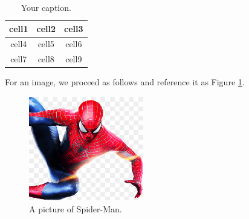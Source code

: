 
\begin{table}[!t]
    \centering
    \caption{Your caption.}
    \begin{tabular}{|c|c|c|}
        \hline
        cell1 & cell2 & cell3 \\ \hline
        cell4 & cell5 & cell6 \\ \hline
        cell7 & cell8 & cell9 \\ \hline
    \end{tabular}
    \label{tab:demo}
\end{table}

For an image, we proceed as follows and reference it as Figure \ref{fig:demo}.

\begin{figure}[!t]
    \centering
    \includegraphics[width=5cm]{spider.png}
    \caption{A picture of Spider-Man.}
    \label{fig:demo}
\end{figure}
